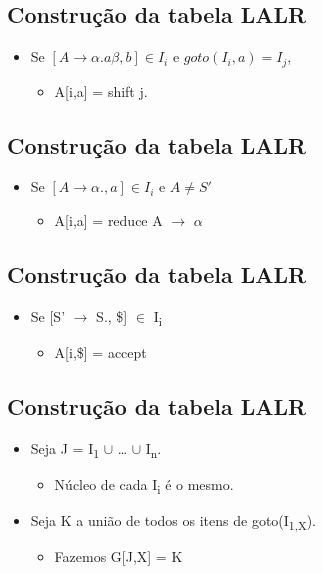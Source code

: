 \documentclass[11pt]{article}
\begin{document}
\subsection*{Construção da tabela LALR}
\label{sec:org7b4fe57}

\begin{itemize}
\item Se \([A \to \alpha .a\beta,b] \in I_i\) e \(goto(I_i,a) = I_j\),
\begin{itemize}
\item A[i,a] = shift j.
\end{itemize}
\end{itemize}
\subsection*{Construção da tabela LALR}
\label{sec:orge956b2b}

\begin{itemize}
\item Se \([A \to \alpha . , a] \in I_i\) e \(A \neq S'\)
\begin{itemize}
\item A[i,a] = reduce A \(\to\) \(\alpha\)
\end{itemize}
\end{itemize}
\subsection*{Construção da tabela LALR}
\label{sec:org8cc05c5}

\begin{itemize}
\item Se [S' \(\to\) S., \$] \(\in\) I\textsubscript{i}
\begin{itemize}
\item A[i,\$] = accept
\end{itemize}
\end{itemize}
\subsection*{Construção da tabela LALR}
\label{sec:org2e5769d}

\begin{itemize}
\item Seja J = I\textsubscript{1} \(\cup\) \ldots{} \(\cup\) I\textsubscript{n}.
\begin{itemize}
\item Núcleo de cada I\textsubscript{i} é o mesmo.
\end{itemize}
\item Seja K a união de todos os itens de goto(I\textsubscript{1,X}).
\begin{itemize}
\item Fazemos G[J,X] = K
\end{itemize}
\end{itemize}
\end{document}
